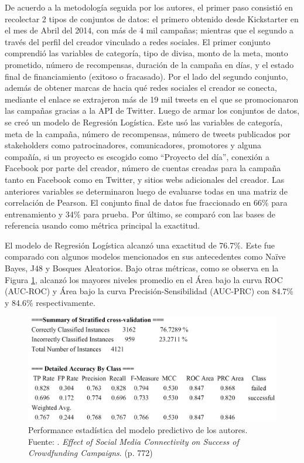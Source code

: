 De acuerdo a la metodología seguida por los autores, el primer paso consistió en recolectar 2 tipos de conjuntos de datos: el primero obtenido desde Kickstarter en el mes de Abril del 2014, con más de 4 mil campañas; mientras que el segundo a través del perfil del creador vinculado a redes sociales. El primer conjunto comprendió las variables de categoría, tipo de divisa, monto de la meta, monto prometido, número de recompensas, duración de la campaña en días, y el estado final de financiamiento (exitoso o fracasado). Por el lado del segundo conjunto, además de obtener marcas de hacia qué redes sociales el creador se conecta, mediante el enlace se extrajeron más de 19 mil tweets en el que se promocionaron las campañas gracias a la API de Twitter. Luego de armar los conjuntos de datos, se creó un modelo de Regresión Logística. Este usó las variables de categoría, meta de la campaña, número de recompensas, número de tweets publicados por stakeholders como patrocinadores, comunicadores, promotores y alguna compañía, si un proyecto es escogido como “Proyecto del día”, conexión a Facebook por parte del creador, número de cuentas creadas para la campaña tanto en Facebook como en Twitter, y sitios webs adicionales del creador. Las anteriores variables se determinaron luego de evaluarse todas en una matriz de correlación de Pearson. El conjunto final de datos fue fraccionado en 66\% para entrenamiento y 34\% para prueba. Por último, se comparó con las bases de referencia usando como métrica principal la exactitud.

El modelo de Regresión Logística alcanzó una exactitud de 76.7\%. Este fue comparado con algunos modelos mencionados en sus antecedentes como Naïve Bayes, J48 y Bosques Aleatorios. Bajo otras métricas, como se observa en la Figura \ref{2:fig120}, alcanzó los mayores niveles promedio en el Área bajo la curva ROC (AUC-ROC) y Área bajo la curva Precisión-Sensibilidad (AUC-PRC) con 84.7\% y 84.6\% respectivamente.

\begin{figure}[!ht]
	\begin{center}
		\includegraphics[width=1\textwidth]{2/figures/kaur2017.jpg}
		\caption[Performance estadística del modelo predictivo de los autores]{Performance estadística del modelo predictivo de los autores.\\
		Fuente: \cite{pr_kaur2017socmedcrowd}. \textit{Effect of Social Media Connectivity on Success of Crowdfunding Campaigns}. (p. 772)}
		\label{2:fig120}
	\end{center}
\end{figure}

